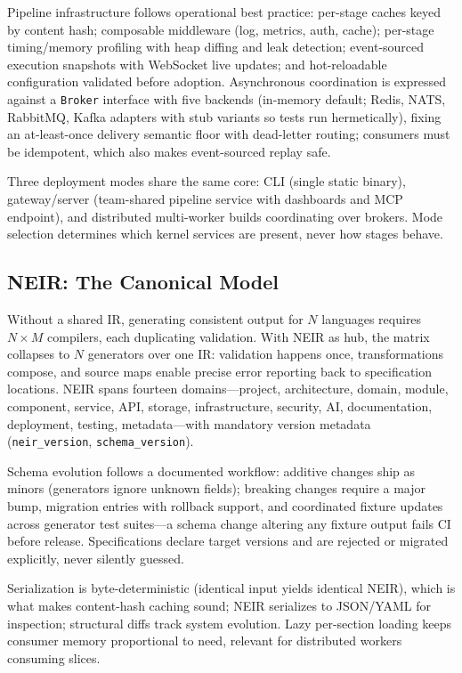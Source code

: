 \documentclass[sigconf,nonacm]{acmart}
\begin{document}
Pipeline infrastructure follows operational best practice: per-stage caches keyed by content hash; composable middleware (log, metrics, auth, cache); per-stage timing/memory profiling with heap diffing and leak detection; event-sourced execution snapshots with WebSocket live updates; and hot-reloadable configuration validated before adoption. Asynchronous coordination is expressed against a \texttt{Broker} interface with five backends (in-memory default; Redis, NATS, RabbitMQ, Kafka adapters with stub variants so tests run hermetically), fixing an at-least-once delivery semantic floor with dead-letter routing; consumers must be idempotent, which also makes event-sourced replay safe.

Three deployment modes share the same core: CLI (single static binary), gateway/server (team-shared pipeline service with dashboards and MCP endpoint), and distributed multi-worker builds coordinating over brokers. Mode selection determines which kernel services are present, never how stages behave.

\subsection{NEIR: The Canonical Model}
\label{sec:neir}
Without a shared IR, generating consistent output for $N$ languages requires $N{\times}M$ compilers, each duplicating validation. With NEIR as hub, the matrix collapses to $N$ generators over one IR: validation happens once, transformations compose, and source maps enable precise error reporting back to specification locations. NEIR spans fourteen domains---project, architecture, domain, module, component, service, API, storage, infrastructure, security, AI, documentation, deployment, testing, metadata---with mandatory version metadata (\texttt{neir\_version}, \texttt{schema\_version}).

Schema evolution follows a documented workflow: additive changes ship as minors (generators ignore unknown fields); breaking changes require a major bump, migration entries with rollback support, and coordinated fixture updates across generator test suites---a schema change altering any fixture output fails CI before release. Specifications declare target versions and are rejected or migrated explicitly, never silently guessed.

Serialization is byte-deterministic (identical input yields identical NEIR), which is what makes content-hash caching sound; NEIR serializes to JSON/YAML for inspection; structural diffs track system evolution. Lazy per-section loading keeps consumer memory proportional to need, relevant for distributed workers consuming slices.
\end{document}
